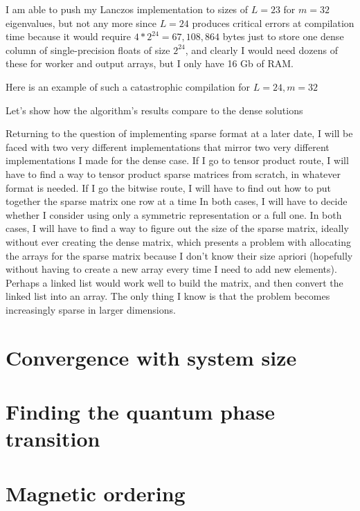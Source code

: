 \documentclass{article}
\begin{document}
I am able to push my Lanczos implementation to sizes of $L = 23$
for $m = 32$ eigenvalues, but not any more since $L = 24$ produces
critical errors at compilation time because it would require
$4 * 2^24 = 67,108,864$ bytes just to store one dense column of 
single-precision floats of size $2^24$, and clearly I would need
dozens of these for worker and output arrays, but I only have 16 Gb of RAM.

Here is an example of such a catastrophic compilation for $L=24, m=32$


Let's show how the algorithm's results compare to the dense solutions

Returning to the question of implementing sparse format at a later date,
I will be faced with two very different implementations that mirror
two very different implementations I made for the dense case.
If I go to tensor product route, I will have to find a way to tensor
product sparse matrices from scratch, in whatever format is needed.
If I go the bitwise route, I will have to find out how to put together
the sparse matrix one row at a time
In both cases, I will have to decide whether I consider using only a
symmetric representation or a full one.
In both cases, I will have to find a way to figure out the size of the
sparse matrix, ideally without ever creating the dense matrix, which
presents a problem with allocating the arrays for the sparse matrix
because I don't know their size apriori (hopefully without having to create 
a new array every time I need to add new elements).
Perhaps a linked list would work well to build the matrix, and then 
convert the linked list into an array.
The only thing I know is that the problem becomes
increasingly sparse in larger dimensions. 

\newpage

\section{
Convergence with system size
}



\newpage

\section{
Finding the quantum phase transition
}



\newpage

\section{
Magnetic ordering
}
\end{document}
